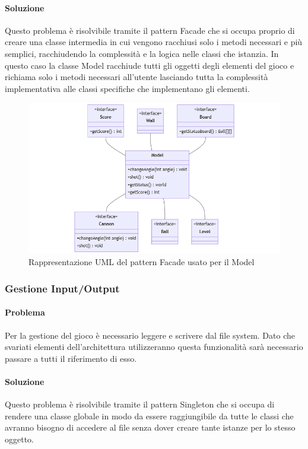 \documentclass[a4paper,12pt]{report}
\begin{document}
\paragraph{Soluzione} Questo problema è risolvibile tramite il pattern Facade che si occupa proprio di creare una classe  intermedia in cui vengono racchiusi solo i metodi necessari e più semplici, racchiudendo la complessità e la logica nelle classi che istanzia. In questo caso la classe Model racchiude tutti gli oggetti degli elementi del gioco e richiama solo i metodi necessari all'utente lasciando tutta la complessità implementativa alle classi specifiche che implementano gli elementi.
\begin{figure}[H]
\includegraphics[width=\textwidth]{img/Diagramma_UML_Architettura_Model}
\caption{Rappresentazione UML del pattern Facade usato per il Model}
\label{img:Diagramma_UML_Architettura_Model}
\end{figure}

\subsubsection{Gestione Input/Output}

\paragraph{Problema} Per la gestione del gioco è necessario leggere e scrivere dal file system. Dato che svariati elementi dell'architettura utilizzeranno questa funzionalità sarà necessario passare a tutti il riferimento di esso. 

\paragraph{Soluzione} Questo problema è risolvibile tramite il pattern Singleton che si occupa di rendere una classe globale in modo da essere raggiungibile da tutte le classi che avranno bisogno di accedere al file senza dover creare tante istanze per lo stesso oggetto. 
\end{document}
